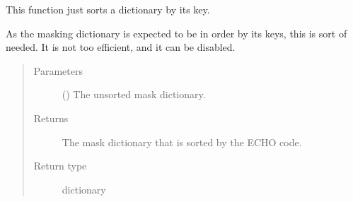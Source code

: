 \documentclass[letterpaper,10pt,english]{sphinxmanual}
\begin{document}

\begin{fulllineitems}
\label{\detokenize{python_docstrings/IfA_Smeargle.echo.echo_functions:IfA_Smeargle.echo.echo_functions.echo_sort_masking_dictionary}}
This function just sorts a dictionary by its key.

As the masking dictionary is expected to be in order by its keys, this
is sort of needed. It is not too efficient, and it can be disabled.
\begin{quote}\begin{description}
\item[{Parameters}] \leavevmode
{} () \textendash{} The unsorted mask dictionary.

\item[{Returns}] \leavevmode
{} \textendash{} The mask dictionary that is sorted by the ECHO code.

\item[{Return type}] \leavevmode
dictionary

\end{description}\end{quote}

\end{fulllineitems}

\end{document}
